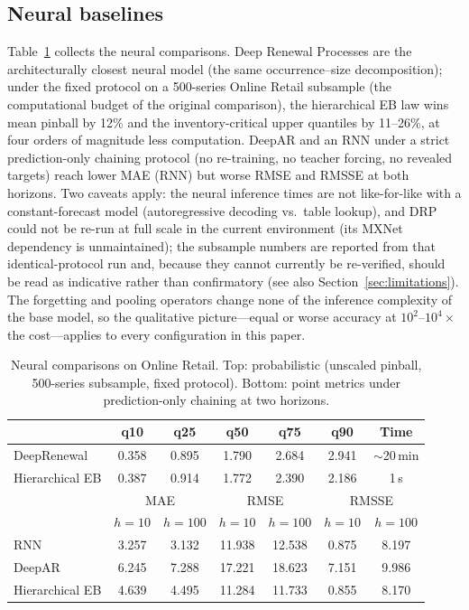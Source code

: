 \documentclass[twocolumn,10pt]{article}
\begin{document}
\subsection{Neural baselines}
\label{app:neural}

Table~\ref{tab:neural} collects the neural comparisons. Deep Renewal
Processes \citep{turkmen2019} are the architecturally closest neural
model (the same occurrence--size decomposition); under the fixed
protocol on a 500-series Online Retail subsample (the computational
budget of the original comparison), the hierarchical EB law wins mean
pinball by 12\% and the inventory-critical upper quantiles by 11--26\%,
at four orders of magnitude less computation. DeepAR and an RNN under a
strict prediction-only chaining protocol (no re-training, no teacher
forcing, no revealed targets) reach lower MAE (RNN) but worse RMSE and
RMSSE at both horizons. Two caveats apply: the neural inference times
are not like-for-like with a constant-forecast model (autoregressive
decoding vs.\ table lookup), and DRP could not be re-run at full scale
in the current environment (its MXNet dependency is unmaintained); the
subsample numbers are reported from that identical-protocol run and,
because they cannot currently be re-verified, should be read as
indicative rather than confirmatory (see also
Section~\ref{sec:limitations}). The forgetting and pooling operators
change none of the inference complexity of the base model, so the
qualitative picture---equal or worse accuracy at $10^2$--$10^4\times$
the cost---applies to every configuration in this paper.

\begin{table}[t]
\centering
\caption{Neural comparisons on Online Retail. Top: probabilistic
(unscaled pinball, 500-series subsample, fixed protocol). Bottom: point
metrics under prediction-only chaining at two horizons.}
\label{tab:neural}
\small
\setlength{\tabcolsep}{4pt}
\begin{tabular}{lcccccc}
\toprule
 & q10 & q25 & q50 & q75 & q90 & Time\\
\midrule
DeepRenewal & 0.358 & 0.895 & 1.790 & 2.684 & 2.941 & $\sim$20\,min\\
Hierarchical EB & 0.387 & 0.914 & 1.772 & 2.390 & 2.186 & 1\,s\\
\midrule
 & \multicolumn{2}{c}{MAE} & \multicolumn{2}{c}{RMSE} & \multicolumn{2}{c}{RMSSE}\\
 & $h{=}10$ & $h{=}100$ & $h{=}10$ & $h{=}100$ & $h{=}10$ & $h{=}100$\\
\midrule
RNN & 3.257 & 3.132 & 11.938 & 12.538 & 0.875 & 8.197\\
DeepAR & 6.245 & 7.288 & 17.221 & 18.623 & 7.151 & 9.986\\
Hierarchical EB & 4.639 & 4.495 & 11.284 & 11.733 & 0.855 & 8.170\\
\bottomrule
\end{tabular}
\end{table}
\end{document}
